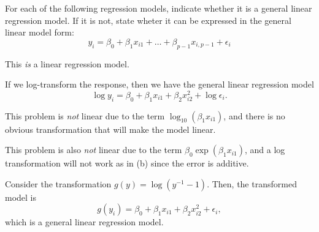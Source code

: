 \documentclass{homework}
\begin{document}
\newpage
\begin{longproblem}
  For each of the following regression models, indicate whether it is a general linear regression model. If it is not, state wheter it can be expressed in the general linear model form:
$$
  y_i = \beta_0 + \beta_1 x_{i1} + \dots + \beta_{p-1}x_{i,p-1} + \epsilon_i
$$


This \emph{is} a linear regression model.


If we log-transform the response, then we have the general linear regression model
$$
  \log y_i = \beta_0 +\beta_1 x_{i1} +\beta_2x_{i2}^2 + \log \epsilon_i.
$$


This problem is \emph{not} linear due to the term $\log_{10}(\beta_1 x_{i1})$, and there is no obvious transformation that will make the model linear.


This problem is also \emph{not} linear due to the term $\beta_0\exp(\beta_1x_{i1})$, and a log transformation will not work as in (b) since the error is additive.


Consider the transformation $g(y) = \log (y^{-1} - 1)$.  Then, the transformed model is
$$
  g(y_i) = \beta_0 +\beta_1 x_{i1} +\beta_2x_{i2}^2+\epsilon_i,
$$
which is a general linear regression model.
\end{longproblem}
\end{document}
